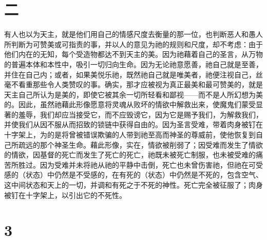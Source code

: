 \section{二}

\par

有人也以为天主，就是他们用自己的情感尺度去衡量的那一位，也判断恶人和愚人所判断为可赞美或可指责的事，并以人的意见为祂的规则和尺度，却不考虑：由于他们内在的无知，每个受造物都达不到天主的美。因为祂藉着自己的圣言，从万物的普遍本体和本性中，吸引一切归向生命。因为无论祂意愿善，祂自己就是至善，并住在自己内；或者，如果美悦乐祂，既然祂自己就是唯美者，祂便注视自己，丝毫不看重那些令人类赞叹的事。确实，那才应被视为真正最美和最可赞美的，就是天主自己所认为是美的，即使它被其余一切所轻看和鄙视——而不是人所幻想为美的。因此，虽然祂藉此形像愿意将灵魂从败坏的情欲中解救出来，使魔鬼们蒙受显著的羞辱，我们却应当接受它，而不应毁谤它，因为它是赐予我们，为解救我们，并使我们从因不服从而招致的锁链中获得自由的。因为圣言受难，带着肉身被钉在十字架上，为的是将曾被错误欺骗的人带到祂至高而神圣的尊威前，使他恢复到自己所疏远的那个神圣生命。藉此形像，实在，情欲被削弱了；因受难而发生了情欲的情欲，因基督的死亡而发生了死亡的死亡，祂既未被死亡制服，也未被受难的痛苦所胜过。因为受难并未将祂从祂的平静中击倒，死亡也未曾伤害祂，但祂在可受感的（状态）中仍然是不受感的，在有死的（状态）中仍然是不死的，包含空气、这中间状态和天上的一切，并调和有死之于不死的神性。死亡完全被征服了；肉身被钉在十字架上，以引出它的不死性。\par


\section{3}

\par

